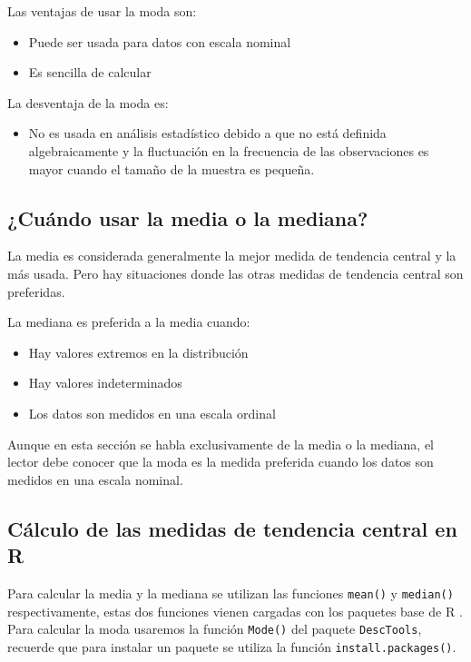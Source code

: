 \documentclass[
]{krantz}
\providecommand{\tightlist}{%
  \setlength{\itemsep}{0pt}\setlength{\parskip}{0pt}}
\begin{document}
Las ventajas de usar la moda son:

\begin{itemize}
\tightlist
\item
  Puede ser usada para datos con escala nominal
\item
  Es sencilla de calcular
\end{itemize}

La desventaja de la moda es:

\begin{itemize}
\tightlist
\item
  No es usada en análisis estadístico debido a que no está definida algebraicamente y la fluctuación en la frecuencia de las observaciones es mayor cuando el tamaño de la muestra es pequeña.
\end{itemize}

\hypertarget{cuando-usar-la-media-o-la-mediana}{%
\subsection{¿Cuándo usar la media o la mediana?}\label{cuando-usar-la-media-o-la-mediana}}

La media es considerada generalmente la mejor medida de tendencia central y la más usada. Pero hay situaciones donde las otras medidas de tendencia central son preferidas.

La mediana es preferida a la media cuando:

\begin{itemize}
\tightlist
\item
  Hay valores extremos en la distribución
\item
  Hay valores indeterminados
\item
  Los datos son medidos en una escala ordinal
\end{itemize}

Aunque en esta sección se habla exclusivamente de la media o la mediana, el lector debe conocer que la moda es la medida preferida cuando los datos son medidos en una escala nominal.

\hypertarget{calculo-de-las-medidas-de-tendencia-central-en-r}{%
\subsection{Cálculo de las medidas de tendencia central en R}\label{calculo-de-las-medidas-de-tendencia-central-en-r}}

Para calcular la media y la mediana se utilizan las funciones \texttt{mean()} y \texttt{median()} respectivamente, estas dos funciones vienen cargadas con los paquetes base de R \citep{verzani2014}. Para calcular la moda usaremos la función \texttt{Mode()} del paquete \texttt{DescTools}, recuerde que para instalar un paquete se utiliza la función \texttt{install.packages()}.
\end{document}
